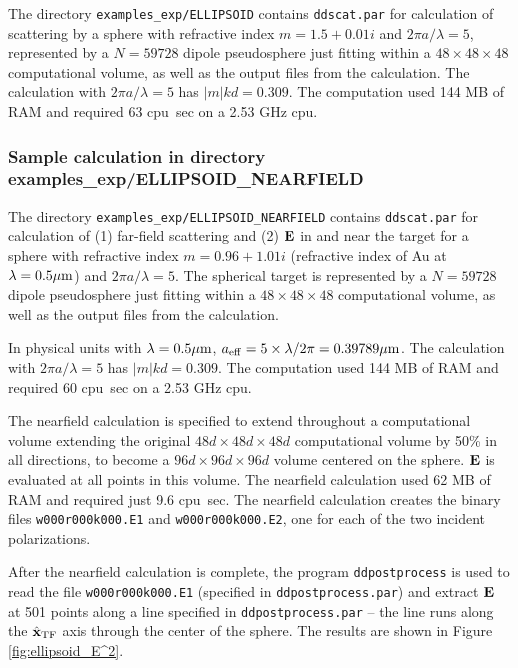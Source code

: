 The directory {\tt examples\_exp/ELLIPSOID} contains {\tt ddscat.par} for
calculation of scattering by a sphere with refractive index $m=1.5+0.01i$
and
$2\pi a/\lambda=5$, represented by a $N=59728$ dipole
pseudosphere just fitting within a
$48\times48\times48$ computational volume, as well as the
output files from the calculation.
The calculation with $2\pi a/\lambda=5$ has $|m|kd=0.309$.
The computation used 144 MB of RAM and required 63 cpu~sec on a 2.53 GHz cpu.

\subsubsection{\label{sec:ELLIPSOID_NEARFIELD}
               \bf Sample calculation in directory 
               examples\_exp/ELLIPSOID\_NEARFIELD}

The directory {\tt examples\_exp/ELLIPSOID\_NEARFIELD} contains 
{\tt ddscat.par} for calculation of 
(1) far-field scattering and (2) ${\bf E}$ in and near the target
for a sphere with refractive index $m=0.96+1.01i$
(refractive index of Au at $\lambda=0.5{\mu{\rm m}}$)
and
$2\pi a/\lambda=5$.
The spherical target is represented by a $N=59728$ dipole
pseudosphere just fitting within a
$48\times48\times48$ computational volume, as well as the
output files from the calculation.

In physical units with $\lambda=0.5{\mu{\rm m}}$, 
${a}_{\rm eff}=5\times\lambda/2\pi=0.39789{\mu{\rm m}}$.
The calculation with $2\pi a/\lambda=5$ has $|m|kd=0.309$.
The computation used 144 MB of RAM and required 60 cpu~sec on a 2.53 GHz cpu.

The nearfield calculation is specified to extend throughout a computational
volume extending the original $48d\times48d\times48d$ computational volume
by 50\% in all directions, to become a $96d\times96d\times96d$ volume
centered on the sphere.
${\bf E}$ is evaluated at all points in this volume.
The nearfield calculation used 62 MB of RAM and required just 9.6 cpu~sec.
The nearfield calculation creates the binary files
{\tt w000r000k000.E1} and {\tt w000r000k000.E2}, one for each of
the two incident polarizations.

After the nearfield calculation is complete, the program {\tt ddpostprocess}
is used to read the file {\tt w000r000k000.E1} 
(specified in {\tt ddpostprocess.par}) and extract ${\bf E}$ at
501 points along a line specified in {\tt ddpostprocess.par} -- the line
runs along the $\hat{\bf x}_{\rm TF}$ axis through the center of the sphere.  The results
are shown in Figure \ref{fig:ellipsoid_E^2}.

